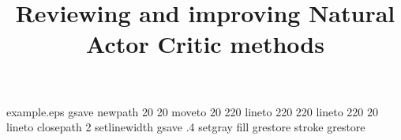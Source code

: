 %
%
%
%
%
\begin{filecontents*}{example.eps}
gsave
newpath
  20 20 moveto
  20 220 lineto
  220 220 lineto
  220 20 lineto
closepath
2 setlinewidth
gsave
  .4 setgray fill
grestore
stroke
grestore
\end{filecontents*}
%
\RequirePackage{fix-cm}
%
\documentclass[smallextended]{svjour3}       %
%
\smartqed  %
%
\usepackage{graphicx}

%
%

\usepackage{natbib} %
\usepackage{amsmath, amssymb}
\usepackage{algorithm}
\usepackage{algorithmic}


\newcommand{\x}{\item}
\DeclareMathOperator{\E}{\mathbb{E}}
\setlength\parindent{0pt}

%
%

\title{Reviewing and improving Natural Actor Critic methods
}

